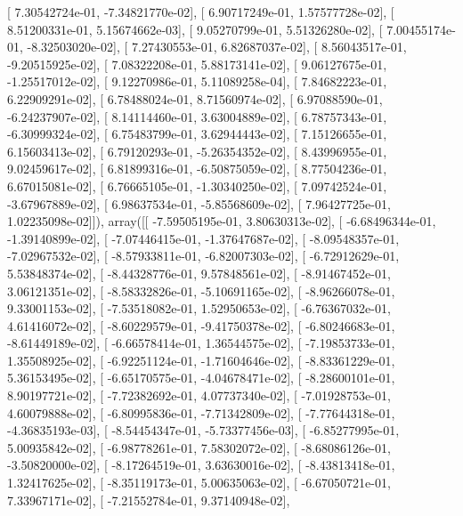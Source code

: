 \documentclass{article}
\begin{document}
       [  7.30542724e-01,  -7.34821770e-02],
       [  6.90717249e-01,   1.57577728e-02],
       [  8.51200331e-01,   5.15674662e-03],
       [  9.05270799e-01,   5.51326280e-02],
       [  7.00455174e-01,  -8.32503020e-02],
       [  7.27430553e-01,   6.82687037e-02],
       [  8.56043517e-01,  -9.20515925e-02],
       [  7.08322208e-01,   5.88173141e-02],
       [  9.06127675e-01,  -1.25517012e-02],
       [  9.12270986e-01,   5.11089258e-04],
       [  7.84682223e-01,   6.22909291e-02],
       [  6.78488024e-01,   8.71560974e-02],
       [  6.97088590e-01,  -6.24237907e-02],
       [  8.14114460e-01,   3.63004889e-02],
       [  6.78757343e-01,  -6.30999324e-02],
       [  6.75483799e-01,   3.62944443e-02],
       [  7.15126655e-01,   6.15603413e-02],
       [  6.79120293e-01,  -5.26354352e-02],
       [  8.43996955e-01,   9.02459617e-02],
       [  6.81899316e-01,  -6.50875059e-02],
       [  8.77504236e-01,   6.67015081e-02],
       [  6.76665105e-01,  -1.30340250e-02],
       [  7.09742524e-01,  -3.67967889e-02],
       [  6.98637534e-01,  -5.85568609e-02],
       [  7.96427725e-01,   1.02235098e-02]]), array([[ -7.59505195e-01,   3.80630313e-02],
       [ -6.68496344e-01,  -1.39140899e-02],
       [ -7.07446415e-01,  -1.37647687e-02],
       [ -8.09548357e-01,  -7.02967532e-02],
       [ -8.57933811e-01,  -6.82007303e-02],
       [ -6.72912629e-01,   5.53848374e-02],
       [ -8.44328776e-01,   9.57848561e-02],
       [ -8.91467452e-01,   3.06121351e-02],
       [ -8.58332826e-01,  -5.10691165e-02],
       [ -8.96266078e-01,   9.33001153e-02],
       [ -7.53518082e-01,   1.52950653e-02],
       [ -6.76367032e-01,   4.61416072e-02],
       [ -8.60229579e-01,  -9.41750378e-02],
       [ -6.80246683e-01,  -8.61449189e-02],
       [ -6.66578414e-01,   1.36544575e-02],
       [ -7.19853733e-01,   1.35508925e-02],
       [ -6.92251124e-01,  -1.71604646e-02],
       [ -8.83361229e-01,   5.36153495e-02],
       [ -6.65170575e-01,  -4.04678471e-02],
       [ -8.28600101e-01,   8.90197721e-02],
       [ -7.72382692e-01,   4.07737340e-02],
       [ -7.01928753e-01,   4.60079888e-02],
       [ -6.80995836e-01,  -7.71342809e-02],
       [ -7.77644318e-01,  -4.36835193e-03],
       [ -8.54454347e-01,  -5.73377456e-03],
       [ -6.85277995e-01,   5.00935842e-02],
       [ -6.98778261e-01,   7.58302072e-02],
       [ -8.68086126e-01,  -3.50820000e-02],
       [ -8.17264519e-01,   3.63630016e-02],
       [ -8.43813418e-01,   1.32417625e-02],
       [ -8.35119173e-01,   5.00635063e-02],
       [ -6.67050721e-01,   7.33967171e-02],
       [ -7.21552784e-01,   9.37140948e-02],
\end{document}
